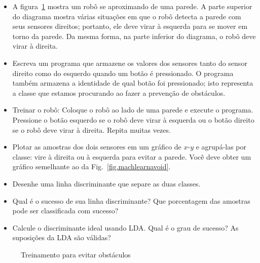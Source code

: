 \begin{framed}
\begin{itemize}
\item A figura~\ref{fig.train-data-avoid} mostra um robô se aproximando de uma parede. A parte superior do diagrama mostra várias situações em que o robô detecta a parede com seus sensores direitos; portanto, ele deve virar à esquerda para se mover em torno da parede. Da mesma forma, na parte inferior do diagrama, o robô deve virar à direita.
\item Escreva um programa que armazene os valores dos sensores tanto do sensor direito como do esquerdo quando um botão é pressionado. O programa também armazena a identidade de qual botão foi pressionado; isto representa a classe que estamos procurando ao fazer a prevenção de obstáculos.
\item Treinar o robô: Coloque o robô ao lado de uma parede e execute o programa. Pressione o botão esquerdo se o robô deve virar à esquerda ou o botão direito se o robô deve virar à direita. Repita muitas vezes.
\item Plotar as amostras dos dois sensores em um gráfico de $x$-$y$ e agrupá-las por classe: vire à direita ou à esquerda para evitar a parede. Você deve obter um gráfico semelhante ao da Fig.~\ref{fig.machlearnavoid}.
\item Desenhe uma linha discriminante que separe as duas classes.
\item Qual é o sucesso de sua linha discriminante? Que porcentagem das amostras pode ser classificada com sucesso?
\item Calcule o discriminante ideal usando LDA. Qual é o grau de sucesso? As suposições da LDA são válidas?
\end{itemize}
\end{framed}

\begin{figure}
\begin{center}
\end{center}
\caption{Treinamento para evitar obstáculos}\label{fig.train-data-avoid}
\end{figure}

